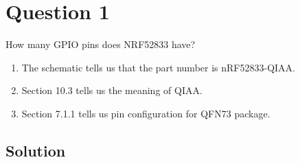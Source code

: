 \section*{Question 1}

How many GPIO pins does NRF52833 have?
\begin{enumerate}[label= (\alph*)]
    \item The schematic tells us that the part number is nRF52833-QIAA.\@
    \item Section 10.3 tells us the meaning of QIAA.\@
    \item Section 7.1.1 tells us pin configuration for QFN73 package.
\end{enumerate}

\subsection*{Solution}
